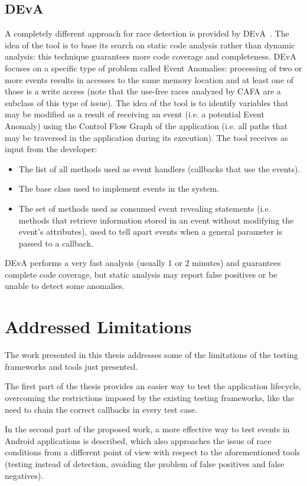 \documentclass[11pt,a4paper,notitlepage]{article}
\begin{document}
\subsection{DEvA}
A completely different approach for race detection is provided by DEvA~\cite{Safi:2015:DEA:2786805.2786836}. The idea of the tool is to base its search on static code analysis rather than dynamic analysis: this technique guarantees more code coverage and completeness. DEvA focuses on a specific type of problem called Event Anomalies: processing of two or more events results in accesses to the same memory location and at least one of those is a write access (note that the use-free races analyzed by CAFA are a subclass of this type of issue). The idea of the tool is to identify variables that may be modified as a result of receiving an event (i.e. a potential Event Anomaly) using the Control Flow Graph of the application (i.e. all paths that may be traversed in the application during its execution). The tool receives as input from the developer:
\begin{itemize}
	\item The list of all methods used as event handlers (callbacks that use the events).
	\item The base class used to implement events in the system.
	\item The set of methods used as consumed event revealing statements (i.e. methods that retrieve information stored in an event without modifying the event's attributes), used to tell apart events when a general parameter is passed to a callback.
\end{itemize}
DEvA performs a very fast analysis (usually 1 or 2 minutes) and guarantees complete code coverage, but static analysis may report false positives or be unable to detect some anomalies.

\section{Addressed Limitations}
The work presented in this thesis addresses some of the limitations of the testing frameworks and tools just presented.

The first part of the thesis provides an easier way to test the application lifecycle, overcoming the restrictions imposed by the existing testing frameworks, like the need to chain the correct callbacks in every test case.

In the second part of the proposed work, a more effective way to test events in Android applications is described, which also approaches the issue of race conditions from a different point of view with respect to the aforementioned tools (testing instead of detection, avoiding the problem of false positives and false negatives).
\end{document}
